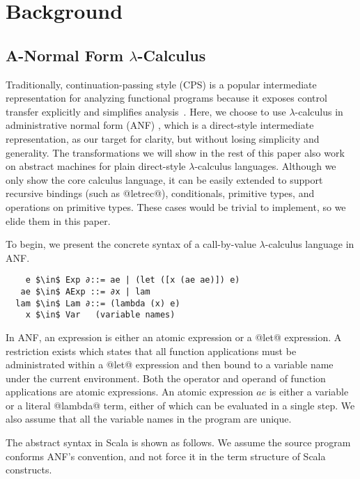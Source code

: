 \documentclass[acmsmall,review,anonymous]{acmart}\settopmatter{printfolios=true,printccs=false,printacmref=false}
\begin{document}
\section{Background} \label{background}

\subsection{A-Normal Form $\lambda$-Calculus} \label{anfsyntax}

Traditionally, continuation-passing style (CPS) is a popular intermediate representation
for analyzing functional programs because it exposes control transfer explicitly
and simplifies analysis~\cite{Shivers:1991:SSC:115865.115884, Shivers:1988:CFA:53990.54007}.
Here, we choose to use $\lambda$-calculus in administrative normal form (ANF) \cite{flanagan1993essence},
which is a direct-style intermediate representation, as our target for clarity,
but without losing simplicity and generality.
The transformations we will show in the rest of this paper
also work on abstract machines for plain direct-style $\lambda$-calculus languages.
Although we only show the core calculus language, it can be easily extended
to support recursive bindings (such as @letrec@), conditionals, primitive types, and
operations on primitive types. These cases would be trivial to implement,
so we elide them in this paper.

To begin, we present the concrete syntax of a call-by-value $\lambda$-calculus language
in ANF.

\begin{lstlisting}
    e $\in$ Exp ∂::= ae | (let ([x (ae ae)]) e)
   ae $\in$ AExp ::= ∂x | lam
  lam $\in$ Lam ∂::= (lambda (x) e)
    x $\in$ Var   (variable names)
\end{lstlisting}

In ANF, an expression is either an atomic expression or a @let@ expression.
A restriction exists which states that all function applications must be administrated
within a @let@ expression and then bound to a variable name under the current environment.
Both the operator and operand of function applications are atomic expressions.
An atomic expression $ae$ is either a variable or a literal @lambda@ term, either of which
can be evaluated in a single step.
We also assume that all the variable names in the program are unique.

The abstract syntax in Scala is shown as follows. We assume the source
program conforms ANF's convention, and not force it in the term structure
of Scala constructs.
\end{document}
